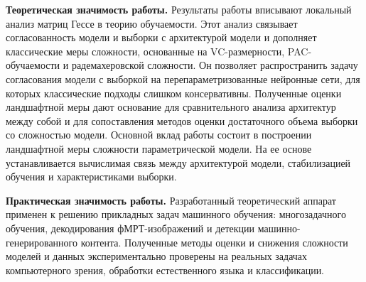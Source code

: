 \documentclass{dissert}
\newcommand{\paragraph}[1]{\noindent\textbf{#1}\quad}
\begin{document}
\paragraph{Теоретическая значимость работы.}
Результаты работы вписывают локальный анализ матриц Гессе в теорию обучаемости.
Этот анализ связывает согласованность модели и выборки с архитектурой модели и дополняет классические меры сложности, основанные на VC-размерности, PAC-обучаемости и радемахеровской сложности.
Он позволяет распространить задачу согласования модели с выборкой на перепараметризованные нейронные сети, для которых классические подходы слишком консервативны.
Полученные оценки ландшафтной меры дают основание для сравнительного анализа архитектур между собой и для сопоставления методов оценки достаточного объема выборки со сложностью модели.
Основной вклад работы состоит в построении ландшафтной меры сложности параметрической модели.
На ее основе устанавливается вычислимая связь между архитектурой модели, стабилизацией обучения и характеристиками выборки.

\paragraph{Практическая значимость работы.}
Разработанный теоретический аппарат применен к решению прикладных задач машинного обучения: многозадачного обучения, декодирования фМРТ-изображений и детекции машинно-генерированного контента.
Полученные методы оценки и снижения сложности моделей и данных экспериментально проверены на реальных задачах компьютерного зрения, обработки естественного языка и классификации.
\end{document}
